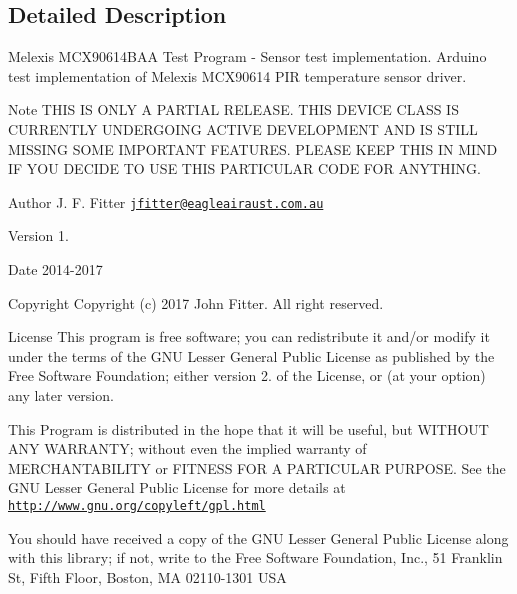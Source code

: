 \subsection{Detailed Description}
Melexis M\-C\-X90614\-B\-A\-A Test Program -\/ Sensor test implementation. Arduino test implementation of Melexis M\-C\-X90614 P\-I\-R temperature sensor driver.

\begin{DoxyNote}{Note}
T\-H\-I\-S I\-S O\-N\-L\-Y A P\-A\-R\-T\-I\-A\-L R\-E\-L\-E\-A\-S\-E. T\-H\-I\-S D\-E\-V\-I\-C\-E C\-L\-A\-S\-S I\-S C\-U\-R\-R\-E\-N\-T\-L\-Y U\-N\-D\-E\-R\-G\-O\-I\-N\-G A\-C\-T\-I\-V\-E D\-E\-V\-E\-L\-O\-P\-M\-E\-N\-T A\-N\-D I\-S S\-T\-I\-L\-L M\-I\-S\-S\-I\-N\-G S\-O\-M\-E I\-M\-P\-O\-R\-T\-A\-N\-T F\-E\-A\-T\-U\-R\-E\-S. P\-L\-E\-A\-S\-E K\-E\-E\-P T\-H\-I\-S I\-N M\-I\-N\-D I\-F Y\-O\-U D\-E\-C\-I\-D\-E T\-O U\-S\-E T\-H\-I\-S P\-A\-R\-T\-I\-C\-U\-L\-A\-R C\-O\-D\-E F\-O\-R A\-N\-Y\-T\-H\-I\-N\-G.
\end{DoxyNote}
\begin{DoxyAuthor}{Author}
J. F. Fitter \href{mailto:jfitter@eagleairaust.com.au}{\tt jfitter@eagleairaust.\-com.\-au} 
\end{DoxyAuthor}
\begin{DoxyVersion}{Version}
1. 
\end{DoxyVersion}
\begin{DoxyDate}{Date}
2014-\/2017 
\end{DoxyDate}
\begin{DoxyCopyright}{Copyright}
Copyright (c) 2017 John Fitter. All right reserved.
\end{DoxyCopyright}
\begin{DoxyParagraph}{License}
This program is free software; you can redistribute it and/or modify it under the terms of the G\-N\-U Lesser General Public License as published by the Free Software Foundation; either version 2. of the License, or (at your option) any later version. 
\end{DoxyParagraph}
\begin{DoxyParagraph}{}
This Program is distributed in the hope that it will be useful, but W\-I\-T\-H\-O\-U\-T A\-N\-Y W\-A\-R\-R\-A\-N\-T\-Y; without even the implied warranty of M\-E\-R\-C\-H\-A\-N\-T\-A\-B\-I\-L\-I\-T\-Y or F\-I\-T\-N\-E\-S\-S F\-O\-R A P\-A\-R\-T\-I\-C\-U\-L\-A\-R P\-U\-R\-P\-O\-S\-E. See the G\-N\-U Lesser General Public License for more details at \href{http://www.gnu.org/copyleft/gpl.html}{\tt http\-://www.\-gnu.\-org/copyleft/gpl.\-html} 
\end{DoxyParagraph}
\begin{DoxyParagraph}{}
You should have received a copy of the G\-N\-U Lesser General Public License along with this library; if not, write to the Free Software Foundation, Inc., 51 Franklin St, Fifth Floor, Boston, M\-A 02110-\/1301 U\-S\-A 
\end{DoxyParagraph}


